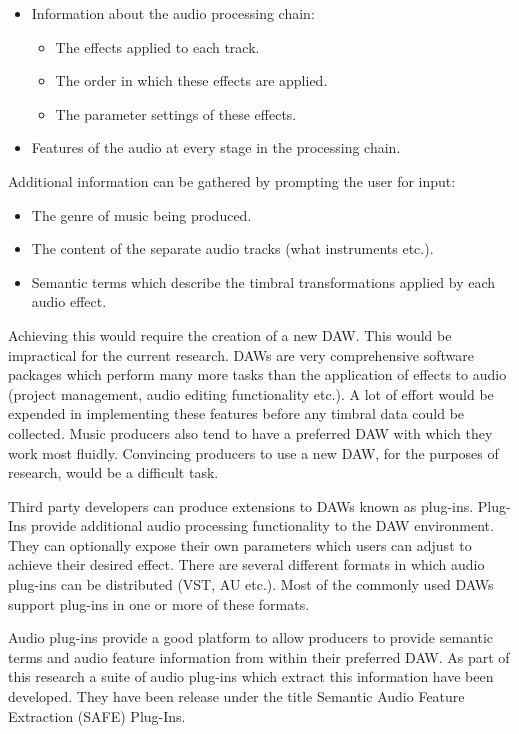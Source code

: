 			\begin{itemize}
				\item Information about the audio processing chain:
				\begin{itemize}
					\item The effects applied to each track.
					\item The order in which these effects are applied.
					\item The parameter settings of these effects.
				\end{itemize}

				\item Features of the audio at every stage in the processing chain.
			\end{itemize}

			Additional information can be gathered by prompting the user for input:

			\begin{itemize}
				\item The genre of music being produced.
				\item The content of the separate audio tracks (what instruments etc.).
				\item Semantic terms which describe the timbral transformations applied by each audio
					effect.
			\end{itemize}

			Achieving this would require the creation of a new DAW. This would be impractical for the current
			research. DAWs are very comprehensive software packages which perform many more tasks than the
			application of effects to audio (project management, audio editing functionality etc.). A lot of
			effort would be expended in implementing these features before any timbral data could be collected.
			Music producers also tend to have a preferred DAW with which they work most fluidly. Convincing
			producers to use a new DAW, for the purposes of research, would be a difficult task.

			Third party developers can produce extensions to DAWs known as plug-ins. Plug-Ins provide additional
			audio processing functionality to the DAW environment. They can optionally expose their own
			parameters which users can adjust to achieve their desired effect. There are several different
			formats in which audio plug-ins can be distributed (VST, AU etc.). Most of the commonly used DAWs
			support plug-ins in one or more of these formats.

			Audio plug-ins provide a good platform to allow producers to provide semantic terms and audio
			feature information from within their preferred DAW. As part of this research a suite of audio
			plug-ins which extract this information have been developed. They have been release under the title
			Semantic Audio Feature Extraction (SAFE) Plug-Ins.

